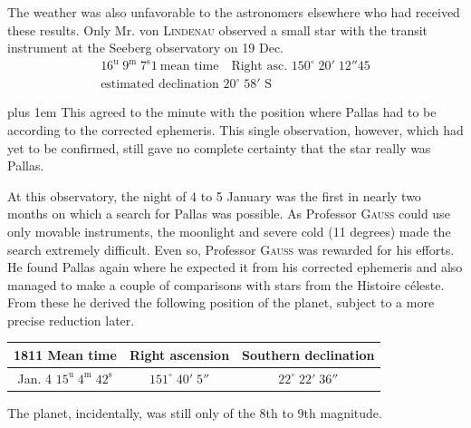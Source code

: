 The weather was also unfavorable to the astronomers elsewhere who had received these results. Only Mr. von \textsc{Lindenau} observed a small star with the transit instrument at the Seeberg observatory on 19 Dec.
\[\begin{gathered}16^{\text{u}}\;9^{\text{m}}\;7^{\text{s}}1\ \text{mean time}\quad\text{Right asc. }150^\circ\;20'\;12''45\\\text{estimated declination }20^\circ\;58'\text{ S}\end{gathered}\]
{\rightskip=0pt plus 1em \noindent This agreed to the minute with the position where Pallas had to be according to the corrected ephemeris. This single observation, however, which had yet to be confirmed, still gave no complete certainty that the star really was Pallas.\par}

\par\indent At this observatory, the night of 4 to 5 January was the first in nearly two months on which a search for Pallas was possible. As Professor \textsc{Gauss} could use only movable instruments, the moonlight and severe cold (11 degrees) made the search extremely difficult. Even so, Professor \textsc{Gauss} was rewarded for his efforts. He found Pallas again where he expected it from his corrected ephemeris and also managed to make a couple of comparisons with stars from the Histoire céleste. From these he derived the following position of the planet, subject to a more precise reduction later.

\begin{center}\fontsize{10}{12}\selectfont\setlength{\tabcolsep}{4pt}\renewcommand{\arraystretch}{1.15}\begin{tabular}{c|c|c}
1811 Mean time & Right ascension & Southern declination\\\hline
Jan. 4 $15^{\text{u}}\;4^{\text{m}}\;42^{\text{s}}$ & $151^\circ\;40'\;5''$ & $22^\circ\;22'\;36''$\\
\end{tabular}\end{center}

\par\indent The planet, incidentally, was still only of the 8th to 9th magnitude.


